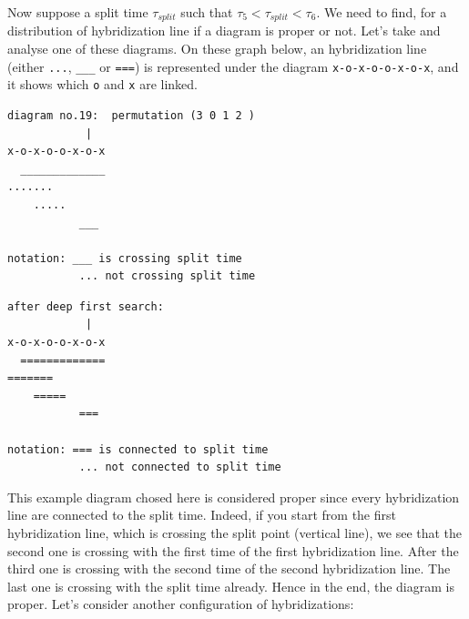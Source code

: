 \documentclass[10pt,letter]{article}
\begin{document}
Now suppose a split time $\tau_{split}$ such that $\tau_5 < \tau_{split} < \tau_6$. We need to find, for a distribution of hybridization line if a diagram is proper or not.  Let's take and analyse one of these diagrams. On these graph below, an hybridization line (either \Verb#...#, \Verb#___# or \Verb#===#) is represented under the diagram \Verb#x-o-x-o-o-x-o-x#, and it shows which \Verb#o# and \Verb#x# are linked.


\noindent\begin{minipage}[t]{.5\textwidth}
\begin{bashInput3}
\begin{lstlisting}[style=BashInputStyle]
diagram no.19:  permutation (3 0 1 2 )
            |    
x-o-x-o-o-x-o-x
  _____________ 
.......         
    .....       
           ___   
          
notation: ___ is crossing split time
           ... not crossing split time
\end{lstlisting}   
\end{bashInput3}
\end{minipage}\hfill
\begin{minipage}[t]{.5\textwidth}
\begin{bashInput3}
\begin{lstlisting}[style=BashInputStyle]
after deep first search:
            |    
x-o-x-o-o-x-o-x
  ============= 
=======         
    =====       
           ===   
          
notation: === is connected to split time
           ... not connected to split time
\end{lstlisting}   
\end{bashInput3}
\end{minipage}

This example diagram chosed here is considered proper since every hybridization line are connected to the split time. Indeed, if you start from the first hybridization line, which is crossing the split point (vertical line), we see that the second one is crossing with the first time of the first hybridization line. After the third one is crossing with the second time of the second hybridization line. The last one is crossing with the split time already. Hence in the end, the diagram is proper. Let's consider another configuration of hybridizations:
\end{document}
